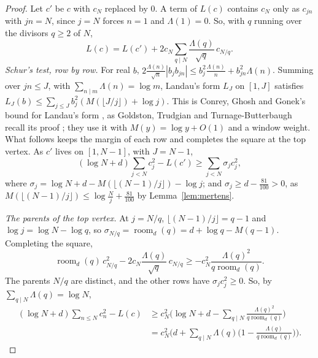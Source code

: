 \documentclass[11pt]{article}
\theoremstyle{definition}
\begin{document}
\begin{proof}
Let $c'$ be $c$ with $c_N$ replaced by $0$. A term of $L(c)$ contains $c_N$ only as $c_{jn}$ with $jn = N$, since $j =
N$ forces $n = 1$ and $\Lambda(1) = 0$. So, with $q$ running over the divisors $q \ge 2$ of $N$,
\[
L(c) = L(c') + 2c_N \sum_{q \mid N} \frac{\Lambda(q)}{\sqrt q}\, c_{N/q}.
\]
\emph{Schur's test, row by row.} For real $b$, $2\frac{\Lambda(n)}{\sqrt n}|b_j b_{jn}| \le b_j^2 \frac{\Lambda(n)}{n}
+ b_{jn}^2 \Lambda(n)$. Summing over $jn \le J$, with $\sum_{n \mid m} \Lambda(n) = \log m$, Landau's form $L_J$ on $[1,
J]$ satisfies $L_J(b) \le \sum_{j \le J} b_j^2 (M(\lfloor J/j \rfloor) + \log j)$.
This is Conrey, Ghosh and Gonek's bound for Landau's form \cite{cgg84}, as Goldston, Trudgian and Turnage-Butterbaugh
recall its proof \cite[Sections~2 and~3]{gtt23}; they use it with $M(y) = \log y + O(1)$ and a window weight. What
follows keeps the margin of each row and completes the square at the top vertex. As $c'$ lives on $[1, N - 1]$, with $J
= N - 1$,
\[
(\log N + d) \sum_{j < N} c_j^2 - L(c') \ge \sum_{j < N} \sigma_j c_j^2,
\]
where $\sigma_j = \log N + d - M(\lfloor (N - 1)/j \rfloor) - \log j$; and $\sigma_j \ge d - \frac{81}{100} > 0$, as
$M(\lfloor (N - 1)/j \rfloor) \le \log\frac Nj + \frac{81}{100}$ by
Lemma~\ref{lem:mertens}.

\emph{The parents of the top vertex.} At $j = N/q$, $\lfloor (N - 1)/j \rfloor = q - 1$ and $\log j = \log N - \log q$,
so $\sigma_{N/q} = \operatorname{room}_d(q) = d + \log q - M(q - 1)$. Completing the square,
\[
\operatorname{room}_d(q)\, c_{N/q}^2 - 2c_N \frac{\Lambda(q)}{\sqrt q}\, c_{N/q} \ge -c_N^2 \frac{\Lambda(q)^2}{q
\operatorname{room}_d(q)}.
\]
The parents $N/q$ are distinct, and the other rows have
$\sigma_j c_j^2 \ge 0$. So, by $\sum_{q \mid N} \Lambda(q) = \log
N$,
\begin{align*}
(\log N + d) \sum_{n \le N} c_n^2 - L(c) &\ge c_N^2 \Big(\log N + d - \sum_{q \mid N} \frac{\Lambda(q)^2}{q
\operatorname{room}_d(q)}\Big) \\
&= c_N^2 \Big(d + \sum_{q \mid N} \Lambda(q)\Big(1 - \frac{\Lambda(q)}{q \operatorname{room}_d(q)}\Big)\Big).
\end{align*}


\end{proof}
\end{document}
